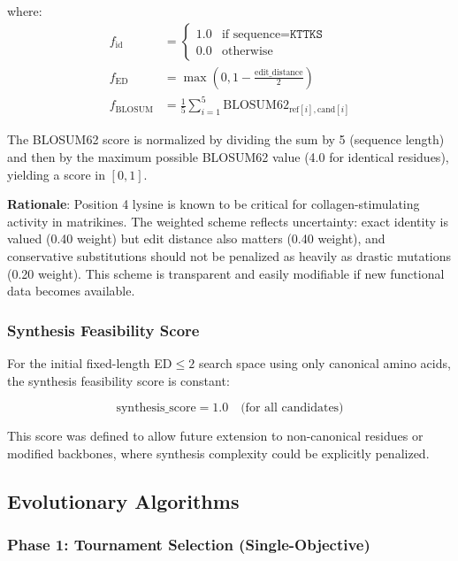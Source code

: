 \documentclass[11pt,a4paper]{article}
\begin{document}
where:
\begin{align}
f_{\text{id}} &= \begin{cases} 1.0 & \text{if sequence} = \texttt{KTTKS} \\ 0.0 & \text{otherwise} \end{cases} \\
f_{\text{ED}} &= \max(0, 1 - \frac{\text{edit\_distance}}{2}) \\
f_{\text{BLOSUM}} &= \frac{1}{5} \sum_{i=1}^{5} \text{BLOSUM62}_{\text{ref}[i], \text{cand}[i]}
\end{align}

The BLOSUM62 score is normalized by dividing the sum by 5 (sequence length) and then by the maximum possible BLOSUM62 value (4.0 for identical residues), yielding a score in $[0, 1]$.

\textbf{Rationale}: Position 4 lysine is known to be critical for collagen-stimulating activity in matrikines\cite{matrikine2010}. The weighted scheme reflects uncertainty: exact identity is valued (0.40 weight) but edit distance also matters (0.40 weight), and conservative substitutions should not be penalized as heavily as drastic mutations (0.20 weight). This scheme is transparent and easily modifiable if new functional data becomes available.

\subsubsection{Synthesis Feasibility Score}

For the initial fixed-length ED$\leq 2$ search space using only canonical amino acids, the synthesis feasibility score is constant:

\begin{equation}
\text{synthesis\_score} = 1.0 \quad \text{(for all candidates)}
\end{equation}

This score was defined to allow future extension to non-canonical residues or modified backbones, where synthesis complexity could be explicitly penalized.

\subsection{Evolutionary Algorithms}

\subsubsection{Phase 1: Tournament Selection (Single-Objective)}
\end{document}
